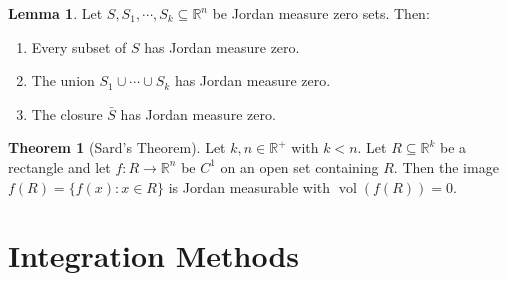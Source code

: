\documentclass[12pt]{article}
\theoremstyle{definition}
\newtheorem{lemma}[definition]{Lemma}
\newtheorem{theorem}[definition]{Theorem}
\theoremstyle{remark}
\begin{document}
\begin{lemma}
Let $S,S_1,\cdots,S_k\subseteq\mathbb{R}^n$ be Jordan measure zero sets. Then:
\begin{enumerate}[label=(\alph*)]
\item Every subset of $S$ has Jordan measure zero.
\item The union $S_1\cup\cdots\cup S_k$ has Jordan measure zero.
\item The closure $\bar{S}$ has Jordan measure zero.
\end{enumerate}
\end{lemma}

\begin{theorem}[Sard's Theorem]
Let $k,n\in \mathbb{R}^+$ with $k<n.$ Let $R\subseteq\mathbb{R}^k$ be a rectangle and let $f:R\to\mathbb{R}^n$ be $C^1$ on an open set containing $R.$ Then the image $f(R)=\{f(x): x\in R\}$ is Jordan measurable with $\operatorname{vol}(f(R))=0.$
\end{theorem}

\section{Integration Methods}
\end{document}
